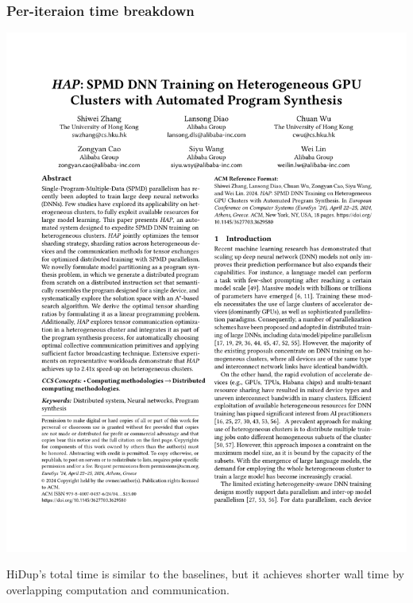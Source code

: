 \documentclass[12pt,aspectratio=169]{beamer}
\begin{document}
    \begin{frame}
        \frametitle{Per-iteraion time breakdown}

        \includegraphics[page=13,trim=2.2cm 21cm 2.2cm 3.5cm,clip,scale=0.81]{paper.pdf}

        HiDup's total time is similar to the baselines, but it achieves shorter wall time by overlapping computation
        and communication.
    \end{frame}
\end{document}
